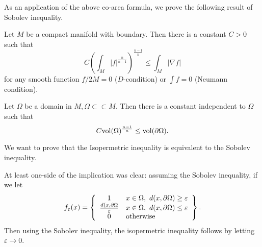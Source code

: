 As an application of the above co-area formula, we prove the following result of Sobolev inequality.

\medskip

 Let $M$ be a compact manifold with boundary. Then there is a constant $ C> 0 $ such that 
%
\[ C \left( \int_M |f| ^{\frac{n}{n-1}} \right)^{\frac{n-1}{n}}\leq \int_M |\nabla f | \]
for any smooth function $ f /2M = 0 $ ($D$-condition) or $ \int f = 0 $ (Neumann condition).

\medskip

 Let $ \Omega $ be a domain in $M, \Omega \subset \subset M$. Then there is a constant independent to $ \Omega $ such that 
%
\[ C {\rm vol} (\Omega ) ^{\frac{n-1}{n}} \leq {\rm vol} (\partial \Omega). \]

We want to prove that the Isopermetric inequality is equivalent to the Sobolev inequality.

At least one-side of the implication was clear: assuming the Sobolev inequality, if we let 
%
\[ f _\varepsilon (x) = \left\{ \begin{array}{cl} 1 & x \in \Omega , \ d (x , \partial \Omega ) \geq \varepsilon \\
\frac{d(x, \partial \Omega }{\varepsilon} & x \in \Omega , \ d (x , \partial \Omega ) \leq \varepsilon\\
0 &  {\rm otherwise} \end{array} \right\}. \]
Then using the Sobolev inequality, the isopermetric inequality follows by letting $ \varepsilon \rightarrow 0 $.

